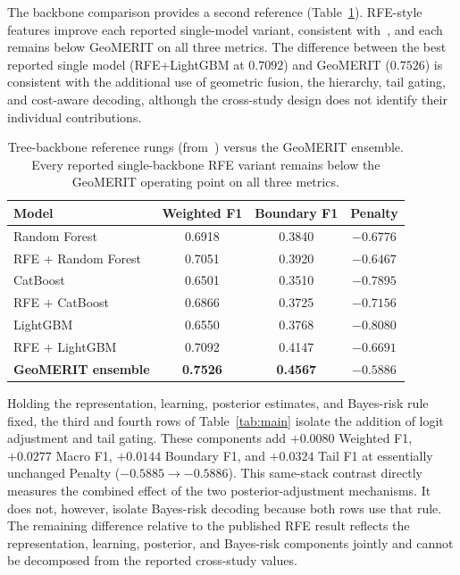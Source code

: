 \documentclass[bdcc,article,submit,pdftex,moreauthors]{Definitions/mdpi}
\begin{document}
The backbone comparison provides a second reference (Table~\ref{tab:backbones}). RFE-style
features improve each reported single-model variant, consistent with~\cite{chen2026rfe}, and
each remains below GeoMERIT on all three metrics. The difference between the best reported
single model (RFE+LightGBM at $0.7092$) and GeoMERIT ($0.7526$) is consistent with the
additional use of geometric fusion, the hierarchy, tail gating, and cost-aware decoding,
although the cross-study design does not identify their individual contributions.

\begin{table}[H]
\caption{Tree-backbone reference rungs (from~\cite{chen2026rfe}) versus the GeoMERIT
ensemble. Every reported single-backbone RFE variant remains below the GeoMERIT operating
point on all three metrics.\label{tab:backbones}}
\begin{tabularx}{\textwidth}{Xccc}
\toprule
\textbf{Model} & \textbf{Weighted F1} & \textbf{Boundary F1} & \textbf{Penalty}\\
\midrule
Random Forest & 0.6918 & 0.3840 & $-0.6776$\\
RFE $+$ Random Forest & 0.7051 & 0.3920 & $-0.6467$\\
CatBoost & 0.6501 & 0.3510 & $-0.7895$\\
RFE $+$ CatBoost & 0.6866 & 0.3725 & $-0.7156$\\
LightGBM & 0.6550 & 0.3768 & $-0.8080$\\
RFE $+$ LightGBM & 0.7092 & 0.4147 & $-0.6691$\\
\textbf{GeoMERIT ensemble} & \textbf{0.7526} & \textbf{0.4567} & $\mathbf{-0.5886}$\\
\bottomrule
\end{tabularx}
\end{table}

Holding the representation, learning, posterior estimates, and Bayes-risk rule fixed, the
third and fourth rows of Table~\ref{tab:main} isolate the addition of logit adjustment and
tail gating. These components add $+0.0080$ Weighted F1, $+0.0277$
Macro F1, $+0.0144$ Boundary F1, and $+0.0324$ Tail F1 at essentially unchanged Penalty
($-0.5885\to-0.5886$). This same-stack contrast directly measures the combined effect of the
two posterior-adjustment mechanisms. It does not, however, isolate Bayes-risk decoding because
both rows use that rule. The remaining difference relative to the published RFE result reflects
the representation, learning, posterior, and Bayes-risk components jointly and cannot be
decomposed from the reported cross-study values.
\end{document}
